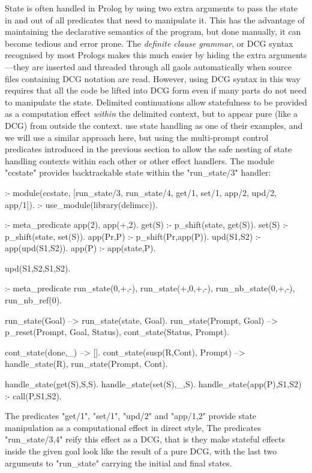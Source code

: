 State is often handled in Prolog by using two extra arguments to pass the state in and out
of all predicates that need to manipulate it. This has the advantage of maintaining the 
declarative semantics of the program, but done manually, it can become tedious and
error prone. The \emph{definite clause grammar}, or DCG syntax \cite{PereiraWarren1980}
recognised by most Prologs makes this much easier by hiding the extra arguments---they are inserted and
threaded through all gaols automatically when source files containing DCG notation
are read. However, using DCG syntax in this way requires that all the code be lifted into DCG form
even if many parts do not need to manipulate the state. Delimited continuations allow statefulness
to be provided as a computation effect \emph{within} the delimited context, but to appear pure
(like a DCG) from outside the context. \cite{SchrijversDemoenDesouter2013} use state handling
as one of their examples, and we will use a similar approach here, but using the multi-prompt
control predicates introduced in the previous section to allow the safe nesting of state handling
contexts within each other or other effect handlers. The module "ccstate" provides backtrackable
state within the "run_state/3" handler:
\begin{prolog-framed}[name=ccstate]
  :- module(ccstate, [run_state/3, run_state/4, 
											get/1, set/1, app/2, upd/2, app/1]).
  :- use_module(library(delimcc)).

  :- meta_predicate app(2), app(+,2).
  get(S)     :- p_shift(state, get(S)).
  set(S)     :- p_shift(state, set(S)).
  app(Pr,P)  :- p_shift(Pr,app(P)).
  upd(S1,S2) :- app(upd(S1,S2)).
  app(P)     :- app(state,P).

  upd(S1,S2,S1,S2).

  :- meta_predicate run_state(0,+,-), run_state(+,0,+,-),
                    run_nb_state(0,+,-), run_nb_ref(0).

  run_state(Goal) --> run_state(state, Goal).
  run_state(Prompt, Goal) -->
     {p_reset(Prompt, Goal, Status)},
     cont_state(Status, Prompt).

  cont_state(done,_) --> [].
  cont_state(susp(R,Cont), Prompt) --> handle_state(R), run_state(Prompt, Cont).

  handle_state(get(S),S,S).
  handle_state(set(S),_,S).
  handle_state(app(P),S1,S2) :- call(P,S1,S2).
\end{prolog-framed}
The predicates "get/1", "set/1", "upd/2" and "app/{1,2}" provide state manipulation as a
computational effect in direct style, The predicates "run_state/{3,4}" reify this effect
as a DCG, that is they make stateful effects inside the given goal look like the result
of a pure DCG, with the last two arguments to "run_state" carrying the initial and final
states.

